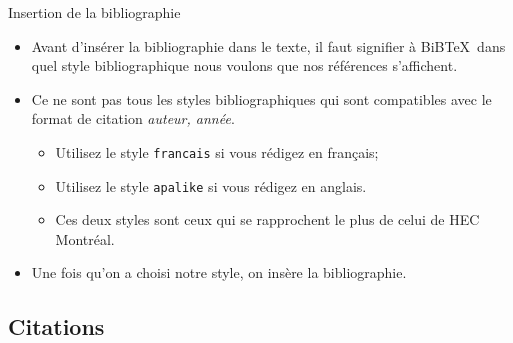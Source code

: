 \begin{frame}[fragile]{Insertion de la bibliographie}
	\begin{itemize}
		\item Avant d'insérer la bibliographie dans le texte, il faut signifier à BiB\TeX\ dans quel
		style bibliographique nous voulons que nos références s'affichent.
\begin{codesource}
	
\end{codesource}
		
		\pause
		
		\item Ce ne sont pas tous les styles bibliographiques qui sont compatibles avec le format de 
			citation \emph{auteur, année}.
			\begin{itemize}
				\scriptsize
				\item Utilisez le style \texttt{francais} si vous rédigez en français;
				\item Utilisez le style \texttt{apalike} si vous rédigez en anglais.
\begin{codesource}
	
	
	
\end{codesource}
				\item Ces deux styles sont ceux qui se rapprochent le plus de celui de HEC Montréal.
			\end{itemize}
		
		\pause
		
		\item Une fois qu'on a choisi notre style, on insère la bibliographie.
\begin{codesource}
	
\end{codesource}
	\end{itemize}
\end{frame}

\subsection{Citations}